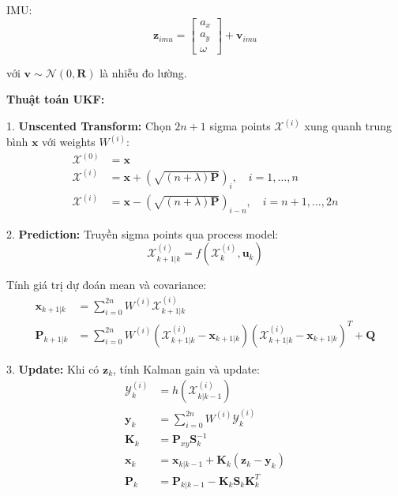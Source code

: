 IMU:
\begin{equation}
\mathbf{z}_{imu} = \begin{bmatrix} a_x \\ a_y \\ \omega \end{bmatrix} + \mathbf{v}_{imu}
\end{equation}

với $\mathbf{v} \sim \mathcal{N}(0, \mathbf{R})$ là nhiễu đo lường.

\textbf{Thuật toán UKF:}

1. \textbf{Unscented Transform:} Chọn $2n+1$ sigma points $\mathcal{X}^{(i)}$ xung quanh trung bình $\mathbf{x}$ với weights $W^{(i)}$:
\begin{equation}
\begin{aligned}
\mathcal{X}^{(0)} &= \mathbf{x} \\
\mathcal{X}^{(i)} &= \mathbf{x} + \left(\sqrt{(n+\lambda)\mathbf{P}}\right)_i, \quad i=1,\ldots,n \\
\mathcal{X}^{(i)} &= \mathbf{x} - \left(\sqrt{(n+\lambda)\mathbf{P}}\right)_{i-n}, \quad i=n+1,\ldots,2n
\end{aligned}
\end{equation}

2. \textbf{Prediction:} Truyền sigma points qua process model:
\begin{equation}
\mathcal{X}_{k+1|k}^{(i)} = f(\mathcal{X}_k^{(i)}, \mathbf{u}_k)
\end{equation}

Tính giá trị dự đoán mean và covariance:
\begin{equation}
\begin{aligned}
\mathbf{x}_{k+1|k} &= \sum_{i=0}^{2n} W^{(i)} \mathcal{X}_{k+1|k}^{(i)} \\
\mathbf{P}_{k+1|k} &= \sum_{i=0}^{2n} W^{(i)} (\mathcal{X}_{k+1|k}^{(i)} - \mathbf{x}_{k+1|k})(\mathcal{X}_{k+1|k}^{(i)} - \mathbf{x}_{k+1|k})^T + \mathbf{Q}
\end{aligned}
\end{equation}

3. \textbf{Update:} Khi có $\mathbf{z}_k$, tính Kalman gain và update:
\begin{equation}
\begin{aligned}
\mathcal{Y}_k^{(i)} &= h(\mathcal{X}_{k|k-1}^{(i)}) \\
\mathbf{y}_k &= \sum_{i=0}^{2n} W^{(i)} \mathcal{Y}_k^{(i)} \\
\mathbf{K}_k &= \mathbf{P}_{xy} \mathbf{S}_k^{-1} \\
\mathbf{x}_k &= \mathbf{x}_{k|k-1} + \mathbf{K}_k (\mathbf{z}_k - \mathbf{y}_k) \\
\mathbf{P}_k &= \mathbf{P}_{k|k-1} - \mathbf{K}_k \mathbf{S}_k \mathbf{K}_k^T
\end{aligned}
\end{equation}

